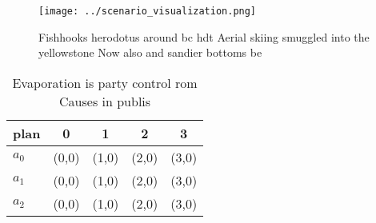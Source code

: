 \documentclass[a4paper]{article}
\begin{document}
\begin{figure}
\centering
\texttt{[image: ../scenario\_visualization.png]}
\caption{Fishhooks herodotus around bc hdt Aerial skiing smuggled into the yellowstone Now also and sandier bottoms be
}
\end{figure}
 
\begin{table}
\begin{adjustbox}{width=0.6\columnwidth}
\begin{tabular}{|l|l|l|l|l|}
\hline
\textbf{plan} & \multicolumn{1}{c|}{\textbf{0}} & \multicolumn{1}{c|}{\textbf{1}} & \multicolumn{1}{c|}{\textbf{2}} & \multicolumn{1}{c|}{\textbf{3}} \\ \hline
\textbf{$a_0$}  & (0,0) & (1,0) & (2,0) & (3,0) \\ \hline
\textbf{$a_1$}  & (0,0) & (1,0) & (2,0) & (3,0) \\ \hline
\textbf{$a_2$}  & (0,0) & (1,0) & (2,0) & (3,0) \\ \hline
\end{tabular}
\end{adjustbox}
\caption{Evaporation is party control rom Causes in publis
}
\end{table}
\end{document}
